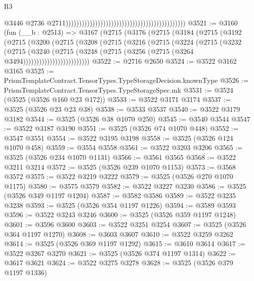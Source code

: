 \begin{lexlean}{R3}
\begin{coremodule}
                                                                                              @3446
                                                                                              @2736
                                                                                              @2711)))))))))))))))))))))))))))))))))))))))))))))
@3521 := @3160
    (fun (__b : @2513) =>
    @3167
      (@2715
        (@3176
          (@2715
            (@3184
              (@2715
                (@3192
                  (@2715
                    (@3200
                      (@2715
                        (@3208
                          (@2715
                            (@3216
                              (@2715
                                (@3224
                                  (@2715
                                    (@3232
                                      (@2715
                                        (@3240
                                          (@2715
                                            (@3248
                                              (@2715
                                                (@3256 (@2715 (@3264 @3494)))))))))))))))))))))))))
@3522 := @2716 @2650
@3524 := @3522 @3162 @3165
@3525 := PrismTemplateContract.TensorTypes.TypeStorageDecision.knownType
@3526 := PrismTemplateContract.TensorTypes.TypeStorageSpec.mk
@3531 := @3524 (@3525 (@3526 @160 @23 @172))
@3533 := @3522 @3171 @3174
@3537 := @3525 (@3526 @23 @23 @38)
@3538 := @3533 @3537
@3540 := @3522 @3179 @3182
@3544 := @3525 (@3526 @38 @1070 @250)
@3545 := @3540 @3544
@3547 := @3522 @3187 @3190
@3551 := @3525 (@3526 @74 @1070 @448)
@3552 := @3547 @3551
@3554 := @3522 @3195 @3198
@3558 := @3525 (@3526 @124 @1070 @458)
@3559 := @3554 @3558
@3561 := @3522 @3203 @3206
@3565 := @3525 (@3526 @234 @1070 @1131)
@3566 := @3561 @3565
@3568 := @3522 @3211 @3214
@3572 := @3525 (@3526 @239 @1070 @1153)
@3573 := @3568 @3572
@3575 := @3522 @3219 @3222
@3579 := @3525 (@3526 @270 @1070 @1175)
@3580 := @3575 @3579
@3582 := @3522 @3227 @3230
@3586 := @3525 (@3526 @349 @1197 @1204)
@3587 := @3582 @3586
@3589 := @3522 @3235 @3238
@3593 := @3525 (@3526 @354 @1197 @1226)
@3594 := @3589 @3593
@3596 := @3522 @3243 @3246
@3600 := @3525 (@3526 @359 @1197 @1248)
@3601 := @3596 @3600
@3603 := @3522 @3251 @3254
@3607 := @3525 (@3526 @364 @1197 @1270)
@3608 := @3603 @3607
@3610 := @3522 @3259 @3262
@3614 := @3525 (@3526 @369 @1197 @1292)
@3615 := @3610 @3614
@3617 := @3522 @3267 @3270
@3621 := @3525 (@3526 @374 @1197 @1314)
@3622 := @3617 @3621
@3624 := @3522 @3275 @3278
@3628 := @3525 (@3526 @379 @1197 @1336)

\end{coremodule}
\end{lexlean}
